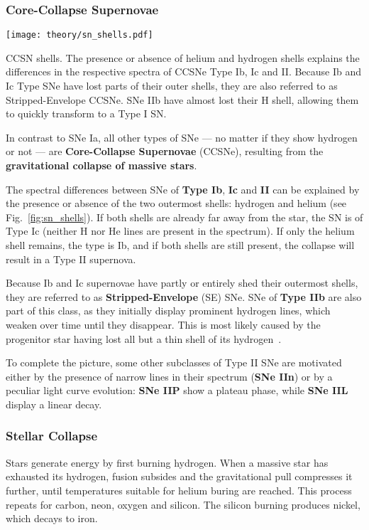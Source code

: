 \subsubsection{Core-Collapse Supernovae}\label{ccsne}

\begin{marginfigure}
    \texttt{[image: theory/sn\_shells.pdf]}
    \caption[CCSN shells]{CCSN shells. The presence or absence of helium and hydrogen shells explains the differences in the respective spectra of CCSNe Type Ib, Ic and II. Because Ib and Ic Type SNe have lost parts of their outer shells, they are also referred to as Stripped-Envelope CCSNe. SNe IIb have almost lost their H shell, allowing them to quickly transform to a Type I SN.}
\end{marginfigure}

In contrast to SNe Ia, all other types of SNe --- no matter if they show hydrogen or not --- are \textbf{Core-Collapse Supernovae} (CCSNe), resulting from the \textbf{gravitational collapse of massive stars}.

The spectral differences between SNe of \textbf{Type Ib}, \textbf{Ic} and \textbf{II} can be explained by the presence or absence of the two outermost shells: hydrogen and helium (see Fig.~\ref{fig:sn_shells}). If both shells are already far away from the star, the SN is of Type Ic (neither H nor He lines are present in the spectrum). If only the helium shell remains, the type is Ib, and if both shells are still present, the collapse will result in a Type II supernova.

Because Ib and Ic supernovae have partly or entirely shed their outermost shells, they are referred to as \textbf{Stripped-Envelope} (SE) SNe. SNe of \textbf{Type IIb} are also part of this class, as they initially display prominent hydrogen lines, which weaken over time until they disappear. This is most likely caused by the progenitor star having lost all but a thin shell of its hydrogen~.

To complete the picture, some other subclasses of Type II SNe are motivated either by the presence of narrow lines in their spectrum (\textbf{SNe IIn}) or by a peculiar light curve evolution: \textbf{SNe IIP} show a plateau phase, while \textbf{SNe IIL} display a linear decay.

\subsubsection{Stellar Collapse}
Stars generate energy by first burning hydrogen. When a massive star has exhausted its hydrogen, fusion subsides and the gravitational pull compresses it further, until temperatures suitable for helium buring are reached. This process repeats for carbon, neon, oxygen and silicon. The silicon burning produces nickel, which decays to iron.

